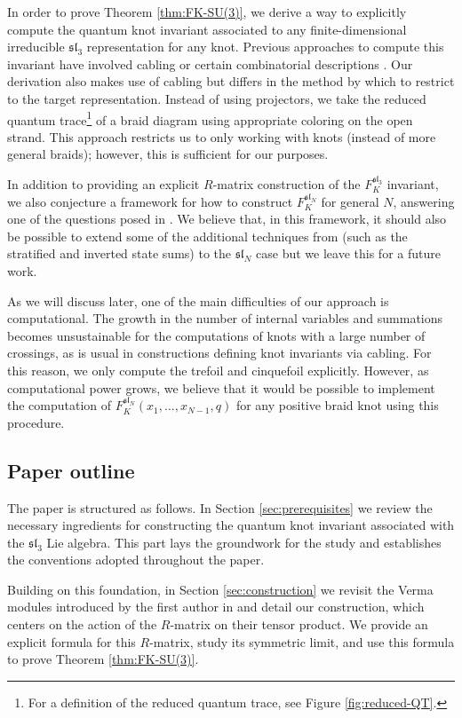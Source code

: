 \documentclass[12pt,oneside,reqno]{amsart}
\numberwithin{teorema}{section}
\numberwithin{definicion}{section}
\numberwithin{lema}{section}
\numberwithin{conjetura}{section}
\numberwithin{proposicion}{section}
\def\sl{\mathfrak{sl}}
\begin{document}
In order to prove Theorem \ref{thm:FK-SU(3)}, we derive a way to explicitly compute the quantum knot invariant associated to any finite-dimensional irreducible $\sl_3$ representation for any knot. Previous approaches to compute this invariant have involved cabling \cite{cabling} or certain combinatorial descriptions \cite{2-webs}. Our derivation also makes use of cabling but differs in the method by which to restrict to the target representation. Instead of using projectors, we take the reduced quantum trace\footnote{For a definition of the reduced quantum trace, see Figure \ref{fig:reduced-QT}.} of a braid diagram using appropriate coloring on the open strand. This approach restricts us to only working with knots (instead of more general braids); however, this is sufficient for our purposes.

In addition to providing an explicit $R$-matrix construction of the $F_K^{\sl_3}$ invariant, we also conjecture a framework for how to construct $F_K^{\sl_N}$ for general $N$, answering one of the questions posed in \cite{ParkLargeColor}. We believe that, in this framework, it should also be possible to extend some of the additional techniques from \cite{ParkLargeColor,Park21,gruen22} (such as the stratified and inverted state sums) to the $\sl_N$ case but we leave this for a future work.

As we will discuss later, one of the main difficulties of our approach is computational. The growth in the number of internal variables and summations becomes unsustainable for the computations of knots with a large number of crossings, as is usual in constructions defining knot invariants via cabling. For this reason, we only compute the trefoil and cinquefoil explicitly. However, as computational power grows, we believe that it would be possible to implement the computation of $F_K^{\sl_N}(x_1,\dots,x_{N-1},q)$ for any positive braid knot using this procedure.

\subsection*{Paper outline}

The paper is structured as follows. In Section \ref{sec:prerequisites} we review the necessary ingredients for constructing the quantum knot invariant associated with the $\sl_3$ Lie algebra. This part lays the groundwork for the study and establishes the conventions adopted throughout the paper.

Building on this foundation, in Section \ref{sec:construction} we revisit the Verma modules introduced by the first author in \cite{gruen22} and detail our construction, which centers on the action of the $R$-matrix on their tensor product. We provide an explicit formula for this $R$-matrix, study its symmetric limit, and use this formula to prove Theorem \ref{thm:FK-SU(3)}.
\end{document}
